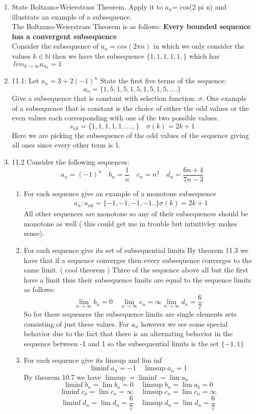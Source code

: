 \documentclass[11pt]{article}
\theoremstyle{definition}  %
\newcommand{\nlim}{\lim_{n\rightarrow \infty}}
\begin{document}
\begin{enumerate}
\begin{proof}
  \end{proof}
  \item State Boltzano-Weierstrass Theorem. Apply it to $a_n$= cos(2 pi n) and illustrate an example of a subsequence.\\
  The Boltzano-Weierstrass Theorem is as follows:
  \textbf{Every bounded sequence has a convergent subsequence}\\
  Consider the subsequence of $a_n=cos(2\pi n)$ in which we only consider the values $k\in \mathbb{N}$ then we have the subsequence $\{1,1,1,1,1,\}$ which has $\
  lim_{k\rightarrow \infty}a_n_k=1$
  \item 11.1: Let $a_n=3+2(-1)^n$
  State the first five terms of the sequence:
  \[
    a_n=\{1,5,1,5,1,5,1,5,1,5,....\}
  \]
  Give a subsequence that is constant with selection function: $\sigma$. One example of a subsequence that is constant is the choice of either the odd values or the even values each corresponding with one of the two possible values.
  \[
    s_{nk}=\{1,1,1,1,1,....,\} \quad \sigma(k)=2k+1
  \]
  Here we are picking the subsequence of the odd values of the sequence giving all ones since every other term is 1.
  \item 11.2  Consider the following sequences:
  \[
    a_n=(-1)^n\quad b_n=\frac{1}{n} \quad c_n=n^2\quad d_n=\frac{6n+4}{7n-3}
  \]
  \begin{enumerate}
    \item For each sequence give an example of a monotone subsequence
    \begin{align*}
      &a_n: a_{nk}=\{-1,-1,-1,-1..\} \sigma(k)=2k+1
    \end{align*}
    All other sequences are monotone so any of their subsequences should be monotone as well ( this could get me in trouble but intuitivley makes sense).
    \item For each sequence give its set of subsequential limits
    By theorem 11.3 we have that if a sequence converges then every subsequence converges to the same limit. ( cool theorem ) Three of the sequence above all but the first have a limit thus their subsequence limits are equal to the sequence limits as follows:
    \[
      \nlim b_n=0\quad \nlim c_n=\infty\nlim d_n=\frac{6}{7}
    \]
    So for these sequences the subsequence limits are single elements sets consisting of just these values. For $a_n$ however we see some special behavior due to the fact that there is an alternating behavior in the sequence between -1 and 1 so the subsequential limits is the set $\{-1,1\}$
    \item For each sequence give its limsup and lim inf
    \[
      \liminf a_n=-1 \quad \limsup a_n=1
    \]
    By theorem 10.7 we have $\limsup=\liminf=\lim a_n$
    \[
      \liminf b_n=\lim b_n=0 \quad \limsup b_n=\lim a_b=0
    \]
    \[
      \liminf c_n=\lim c_n=\infty \quad \limsup c_n=\lim c_n=\infty
    \]
    \[
      \liminf d_n=\lim d_n=\frac{6}{7} \quad \limsup d_n=\lim d_n=\frac{6}{7}
    \]


\end{enumerate}
\end{enumerate}
\end{document}
